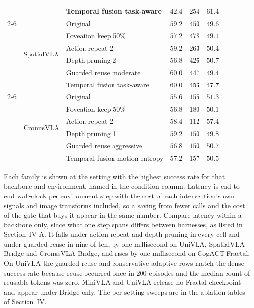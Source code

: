 \begin{table}[t]
\begin{tabular}{ll l rrr}
 &  & Temporal fusion task-aware & $42.4$ & $254$ & $61.4$ \\
\cmidrule(l){2-6}
 & \multirow{6}{*}{SpatialVLA} & Original & $59.2$ & $450$ & $49.6$ \\
 &  & Foveation keep 50\% & $57.2$ & $478$ & $49.1$ \\
 &  & Action repeat 2 & $59.2$ & $263$ & $50.4$ \\
 &  & Depth pruning 2 & $56.8$ & $426$ & $50.7$ \\
 &  & Guarded reuse moderate & $60.0$ & $447$ & $49.4$ \\
 &  & Temporal fusion task-aware & $60.0$ & $453$ & $47.7$ \\
\cmidrule(l){2-6}
 & \multirow{6}{*}{CronusVLA} & Original & $55.6$ & $155$ & $51.3$ \\
 &  & Foveation keep 50\% & $56.8$ & $180$ & $50.1$ \\
 &  & Action repeat 2 & $58.4$ & $112$ & $57.4$ \\
 &  & Depth pruning 1 & $59.2$ & $150$ & $49.8$ \\
 &  & Guarded reuse aggressive & $56.8$ & $150$ & $50.7$ \\
 &  & Temporal fusion motion-entropy & $57.2$ & $157$ & $50.5$ \\
\bottomrule
\end{tabular}
\vspace{2pt}
\parbox{\textwidth}{\footnotesize Each family is shown at the setting with the highest success rate for that backbone and environment, named in the condition column. Latency is end-to-end wall-clock per environment step with the cost of each intervention's own signals and image transforms included, so a saving from fewer calls and the cost of the gate that buys it appear in the same number. Compare latency within a backbone only, since what one step spans differs between harnesses, as listed in Section~IV-A. It falls under action repeat and depth pruning in every cell and under guarded reuse in nine of ten, by one millisecond on UniVLA, SpatialVLA Bridge and CronusVLA Bridge, and rises by one millisecond on CogACT Fractal. On UniVLA the guarded reuse and conservative-adaptive rows match the dense success rate because reuse occurred once in 200 episodes and the median count of reusable tokens was zero. MiniVLA and UniVLA release no Fractal checkpoint and appear under Bridge only. The per-setting sweeps are in the ablation tables of Section~IV.}
\end{table}
